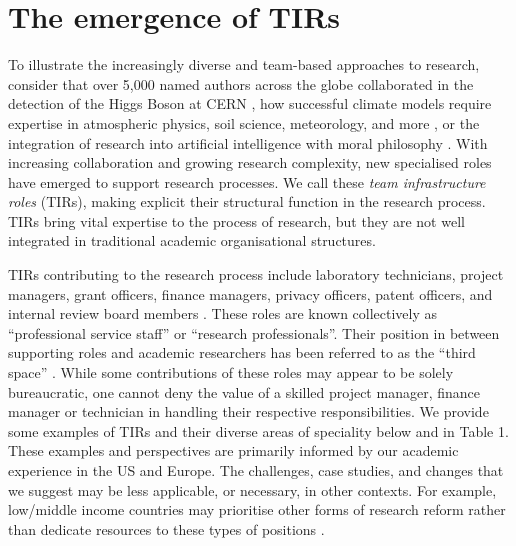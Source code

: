 \documentclass[authordate,meta]{jote-new-article}
\begin{document}
\section{The emergence of TIRs}







To illustrate the increasingly diverse and team-based approaches to research, consider that over 5,000 named authors across the globe collaborated in the detection of the Higgs Boson at CERN \parencites{Castelvecchi2015}, how successful climate models require expertise in atmospheric physics, soil science, meteorology, and more \parencites{Huebner2017}, or the integration of research into artificial intelligence with moral philosophy \parencites{Jobin2019}. With increasing collaboration and growing research complexity, new specialised roles have emerged to support research processes. We call these \emph{team infrastructure roles }(TIRs), making explicit their structural function in the research process. TIRs bring vital expertise to the process of research, but they are not well integrated in traditional academic organisational structures.











TIRs contributing to the research process include laboratory technicians, project managers, grant officers, finance managers, privacy officers, patent officers, and internal review board members \parencites{Heffner1979}{UKRI2023}. These roles are known collectively as “professional service staff” or “research professionals”. Their position in between supporting roles and academic researchers has been referred to as the “third space” \parencites{Whitchurch2008}. While some contributions of these roles may appear to be solely bureaucratic, one cannot deny the value of a skilled project manager, finance manager or technician in handling their respective responsibilities. We provide some examples of TIRs and their diverse areas of speciality below and in Table 1. These examples and perspectives are primarily informed by our academic experience in the US and Europe. The challenges, case studies, and changes that we suggest may be less applicable, or necessary, in other contexts. For example, low/middle income countries may prioritise other forms of research reform rather than dedicate resources to these types of positions \parencites{Bezuidenhout2018}{Bezuidenhout2017}{Onie2020}.
\end{document}
